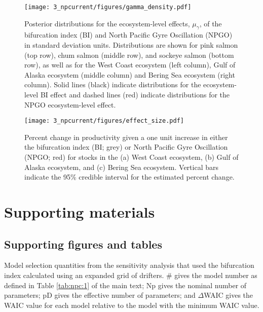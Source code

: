 \begin{figure}[htbp]
  \centering \texttt{[image: 3\_npcurrent/figures/gamma\_density.pdf]}
  \caption[Posterior distributions for the ecosystem-level effects of the
           bifurcation index and North Pacific Gyre Oscillation]{Posterior
           distributions for the ecosystem-level effects, \(\mu_{\gamma}\), of
           the bifurcation index (BI) and North Pacific Gyre Oscillation (NPGO)
           in standard deviation units. Distributions are shown for pink salmon
           (top row), chum salmon (middle row), and sockeye salmon (bottom row),
           as well as for the West Coast ecosystem (left column), Gulf of Alaska
           ecosystem (middle column) and Bering Sea ecosystem (right column).
           Solid lines (black) indicate distributions for the ecosystem-level BI
           effect and dashed lines (red) indicate distributions for the NPGO
           ecosystem-level effect.}
  \label{fig:npc:4}
\end{figure}

\begin{figure}[htbp]
  \centering \texttt{[image: 3\_npcurrent/figures/effect\_size.pdf]}
  \caption[Percent change in productivity given a one unit increase in either
           the bifurcation index or North Pacific Gyre Oscillation]{Percent
           change in productivity given a one unit increase in either the
           bifurcation index (BI; grey) or North Pacific Gyre Oscillation (NPGO;
           red) for stocks in the (a) West Coast ecosystem, (b) Gulf of Alaska
           ecosystem, and (c) Bering Sea ecosystem. Vertical bars indicate the
           95\% credible interval for the estimated percent change.}
    \label{fig:npc:5}
\end{figure}



\newpage
\section{Supporting materials}

\subsection{Supporting figures and tables}


\begin{table}[!ht]
  \small \centering \libertineLF
  \caption[Model selection quantities for models fit with the bifurcation index
           calculated using an expanded grid of drifters]{Model selection
           quantities from the sensitivity analysis that used the bifurcation
           index calculated using an expanded grid of drifters. \# gives the
           model number as defined in Table \ref{tab:npc:1} of the main text; Np
           gives the nominal number of parameters; pD gives the effective number
           of parameters; and $\Delta$WAIC gives the WAIC value for each model
           relative to the model with the minimum WAIC value.}
  
  \label{tab:npc:s1}
\end{table}


